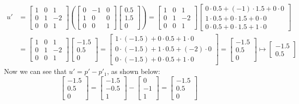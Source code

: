 \documentclass{article}
\begin{document}
\begin{align*}
	u' & =  \begin{bmatrix}1&0&1\\ 0&1&-2\\0&0&1\end{bmatrix} \left( \begin{bmatrix}0&-1&0\\ 1&0&0\\ 0&0&1\end{bmatrix}\begin{bmatrix}0.5\\ 1.5\\ 0\end{bmatrix} \right)  =  \begin{bmatrix}1&0&1\\ 0&1&-2\\0&0&1\end{bmatrix}\begin{bmatrix}0\cdot 0.5+\left(-1\right)\cdot 1.5+0\cdot 0\\ 1\cdot 0.5+0\cdot 1.5+0\cdot 0\\ 0\cdot 0.5+0\cdot 1.5+1\cdot 0\end{bmatrix} \\
	& = \begin{bmatrix}1&0&1\\ 0&1&-2\\0&0&1\end{bmatrix}\begin{bmatrix}-1.5\\ 0.5\\ 0\end{bmatrix} = \begin{bmatrix}1\cdot \left(-1.5\right)+0\cdot 0.5+1\cdot 0\\ 0\cdot \left(-1.5\right)+1\cdot 0.5+\left(-2\right)\cdot 0\\ 0\cdot \left(-1.5\right)+0\cdot 0.5+1\cdot 0\end{bmatrix} = \begin{bmatrix}-1.5\\ 0.5\\ 0\end{bmatrix} \mapsto \begin{bmatrix}-1.5\\ 0.5 \end{bmatrix}
\end{align*}
Now we can see that $u' = p' - p'_1$, as shown below:
\[ \begin{bmatrix}-1.5\\ 0.5\\ 0\end{bmatrix} = \begin{bmatrix}-1.5\\ -0.5\\ 1\end{bmatrix} - \begin{bmatrix}0\\ -1\\ 1\end{bmatrix} = \begin{bmatrix}-1.5\\ 0.5\\ 0\end{bmatrix} \]
\end{document}
